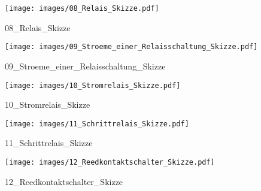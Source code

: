 %
%
\begin{figure}[!hb]%
    \centering
  \texttt{[image: images/08\_Relais\_Skizze.pdf]}%
  \caption{08_Relais_Skizze}%
\end{figure}

%
%
\begin{figure}[!hb]%
    \centering
  \texttt{[image: images/09\_Stroeme\_einer\_Relaisschaltung\_Skizze.pdf]}%
  \caption{09_Stroeme_einer_Relaisschaltung_Skizze}%
\end{figure}

%
%
\begin{figure}[!hb]%
    \centering
  \texttt{[image: images/10\_Stromrelais\_Skizze.pdf]}%
  \caption{10_Stromrelais_Skizze}%
\end{figure}

%
%
\begin{figure}[!hb]%
    \centering
  \texttt{[image: images/11\_Schrittrelais\_Skizze.pdf]}%
  \caption{11_Schrittrelais_Skizze}%
\end{figure}

%
%
\begin{figure}[!hb]%
    \centering
  \texttt{[image: images/12\_Reedkontaktschalter\_Skizze.pdf]}%
  \caption{12_Reedkontaktschalter_Skizze}%
\end{figure}

